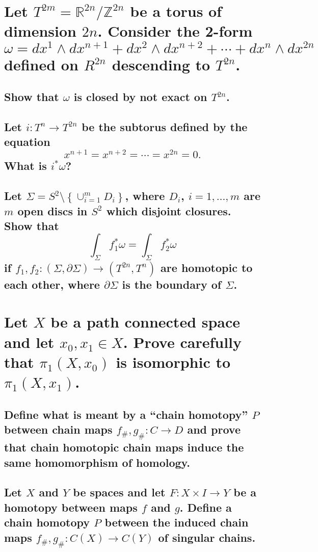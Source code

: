 \documentclass[10pt]{article}
\begin{document}
\section{Let $T^{2m} = \mathbb{R}^{2n} / \mathbb{Z}^{2n}$ be a torus of dimension $2n$. Consider the
  2-form
  $$\omega = dx^1 \wedge dx^{n+1} + dx^2 \wedge dx^{n+2} + \cdots + dx^n \wedge dx^{2n}$$
  defined on $R^{2n}$ descending to $T^{2n}$.}

\subsection{Show that $\omega$ is closed by not exact on $T^{2n}$.}

\subsection{Let $i : T^n \to T^{2n}$ be the subtorus defined by the equation
  $$x^{n+1} =x^{n+2} = \cdots =x^{2n}=0.$$
  What is $i^*\omega$?}

\subsection{Let $\Sigma = S^2 \setminus \left\{ \cup^m_{i=1} D_i \right\}$, where $D_i$,
  $i=1,\dots,m$ are $m$ open discs in $S^2$ which disjoint closures. Show that
  $$ \int_\Sigma f^*_1 \omega = \int_\Sigma f^*_2 \omega$$
  if $f_1, f_2 : (\Sigma, \partial \Sigma) \to (T^{2n}, T^n)$ are homotopic to each other, where
  $\partial \Sigma$ is the boundary of $\Sigma$.}

\section{Let $X$ be a path connected space and let $x_0, x_1 \in X$. Prove carefully that
  $\pi_1(X,x_0)$ is isomorphic to $\pi_1(X,x_1)$.}


\advsection{}

\subsection{Define what is meant by a ``chain homotopy'' $P$ between chain maps $f_\#, g_\#: C \to
  D$ and prove that chain homotopic chain maps induce the same homomorphism of homology.}

\subsection{Let $X$ and $Y$ be spaces and let $F: X \times I \to Y$ be a homotopy between maps $f$
  and $g$. Define a chain homotopy $P$ between the induced chain maps $f_\#, g_\#: C(X) \to C(Y)$ of
  singular chains.}
\end{document}
